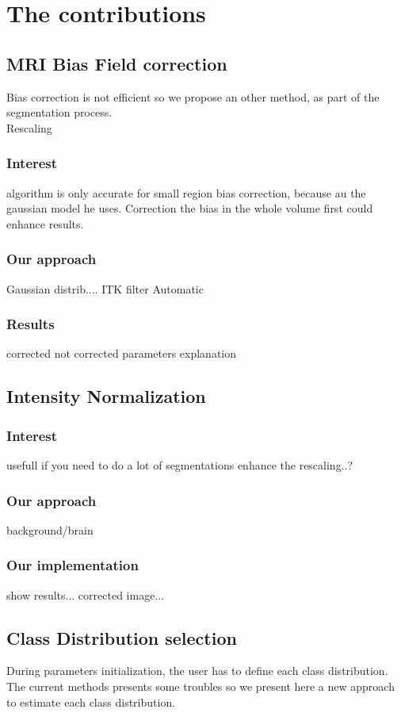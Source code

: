 \chapter{The contributions}\label{sec:contributions}

%
\section{MRI Bias Field correction}

Bias correction is not efficient so we propose an other method, as part of the segmentation process.\\
Rescaling

\subsection{Interest}

algorithm is only accurate for small region bias correction, because au the gaussian model he uses.
Correction the bias in the whole volume first could enhance results.

\subsection{Our approach}

Gaussian distrib....
ITK filter
Automatic
\subsection{Results}
corrected not corrected
parameters explanation

%
\section{Intensity Normalization}
\subsection{Interest}
usefull if you need to do a lot of segmentations
enhance the rescaling..?
\subsection{Our approach}
background/brain
\subsection{Our implementation}
show results... corrected image...
%
\section{Class Distribution selection}\label{sec:CDS}
%
During parameters initialization, the user has to define each class distribution. The current methods presents some troubles so we present here a new approach to estimate each class distribution.
%
